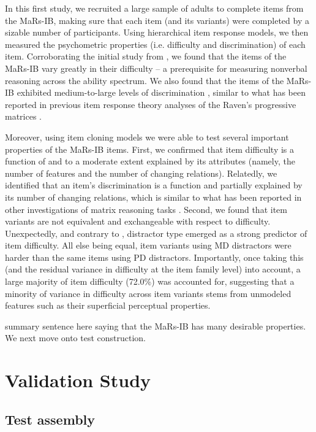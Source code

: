 \documentclass[a4paper,man,natbib]{apa6}
\begin{document}
In this first study, we recruited a large sample of adults to complete items from the MaRs-IB, making sure that each item (and its variants) were completed by a sizable number of participants. Using hierarchical item response models, we then measured the psychometric properties (i.e. difficulty and discrimination) of each item. Corroborating the initial study from \cite{chierchia2019matrix}, we found that the items of the MaRs-IB vary greatly in their difficulty -- a prerequisite for measuring nonverbal reasoning across the ability spectrum. We also found that the items of the MaRs-IB exhibited medium-to-large levels of discrimination \citep{baker2017basics}, similar to what has been reported in previous item response theory analyses of the Raven's progressive matrices \citep{chiesi2012using}.

Moreover, using item cloning models we were able to test several important properties of the MaRs-IB items. First, we confirmed that item difficulty is a function of and to a moderate extent explained by its attributes (namely, the number of features and the number of changing relations). Relatedly, we identified that an item's discrimination is a function and partially explained by its number of changing relations, which is similar to what has been reported in other investigations of matrix reasoning tasks \citep{embretson1999generating}. Second, we found that item variants are not equivalent and exchangeable with respect to difficulty. Unexpectedly, and contrary to \cite{chierchia2019matrix}, distractor type emerged as a strong predictor of item difficulty. All else being equal, item variants using MD distractors were harder than the same items using PD distractors. Importantly, once taking this (and the residual variance in difficulty at the item family level) into account, a large majority of item difficulty (72.0\%) was accounted for, suggesting that a minority of variance in difficulty across item variants stems from unmodeled features such as their superficial perceptual properties. 

summary sentence here saying that the MaRs-IB has many desirable properties. We next move onto test construction.

\section{Validation Study}

\subsection{Test assembly}
\end{document}

